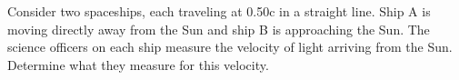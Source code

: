 Consider two spaceships, each traveling at 0.50c in a straight line. 
Ship A is moving directly away from the Sun and ship B is approaching the Sun. 
The science officers on each ship measure the velocity of light arriving from the Sun. %
Determine what they measure for this velocity.
